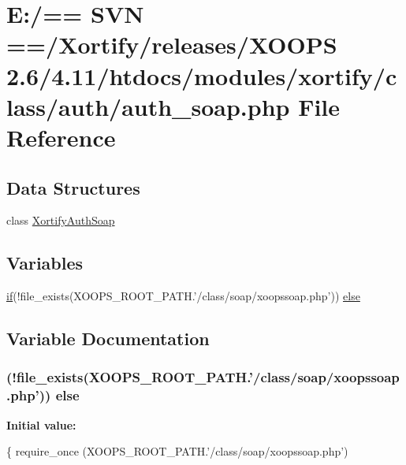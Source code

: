 \hypertarget{auth__soap_8php}{\section{E\-:/== S\-V\-N ==/\-Xortify/releases/\-X\-O\-O\-P\-S 2.6/4.11/htdocs/modules/xortify/class/auth/auth\-\_\-soap.php File Reference}
\label{auth__soap_8php}
}
\subsection*{Data Structures}
\begin{DoxyCompactItemize}
\item 
class \hyperlink{class_xortify_auth_soap}{Xortify\-Auth\-Soap}
\end{DoxyCompactItemize}
\subsection*{Variables}
\begin{DoxyCompactItemize}
\item 
\hyperlink{poll_2index_8php_ae404acbb304be6b6ac443de921697faf}{if}(!file\-\_\-exists(X\-O\-O\-P\-S\-\_\-\-R\-O\-O\-T\-\_\-\-P\-A\-T\-H.'/class/soap/xoopssoap.\-php')) \hyperlink{auth__soap_8php_aa1dfe8b03eb0a67bfa60d8a6a976ff12}{else}
\end{DoxyCompactItemize}


\subsection{Variable Documentation}
\hypertarget{auth__soap_8php_aa1dfe8b03eb0a67bfa60d8a6a976ff12}{
\subsubsection[{else}]{ (!file\-\_\-exists(X\-O\-O\-P\-S\-\_\-\-R\-O\-O\-T\-\_\-\-P\-A\-T\-H.'/class/soap/xoopssoap.\-php')) else}}\label{auth__soap_8php_aa1dfe8b03eb0a67bfa60d8a6a976ff12}
{\bfseries Initial value\-:}
\begin{DoxyCode}
\{
    require\_once (XOOPS\_ROOT\_PATH.\textcolor{stringliteral}{'/class/soap/xoopssoap.php'})
\end{DoxyCode}

